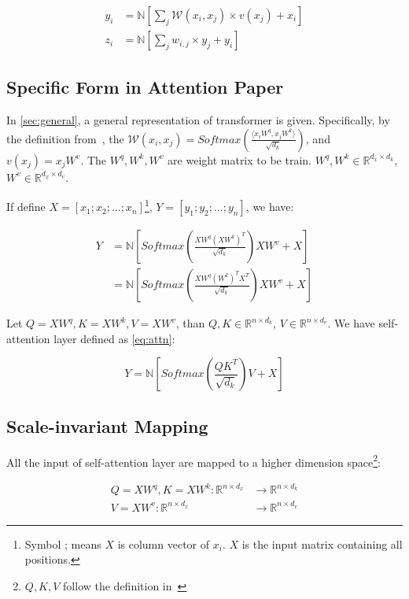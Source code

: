 \documentclass[final]{cvpr}
\begin{document}
\begin{align}
    {y_i}&=\mathbb{N}\left[\sum_{j}\mathcal{W}(x_i,x_j)\times{v}({x_j})+x_i\right]\label{eq:all-sa}\\
    {z_i}&=\mathbb{N}\left[\sum_jw_{i,j}\times{y_j}+y_i\right]\label{eq:all-ff}
\end{align}

\subsection{Specific Form in Attention Paper}
In \autoref{sec:general}, a general representation of transformer is given. Specifically, by the definition from~\cite{vaswani2017attention}, the $\mathcal{W}(x_i,x_j)=Softmax(\frac{\langle x_iW^q,x_jW^k\rangle}{\sqrt{d_k}})$, and $v(x_j)=x_jW^v$. The $W^q, W^k, W^v$ are weight matrix to be train. $W^q,W^k\in\mathbb{R}^{{d_x}\times{d_k}}$, $W^v\in\mathbb{R}^{d_x\times{d_v}}$.

If define $X=[x_1;x_2;...;x_n]$\footnote{Symbol ; means $X$ is column vector of $x_i$. $X$ is the input matrix containing all positions.}, $Y=[y_1;y_2;...;y_n]$, we have:

\begin{align}
    Y&=\mathbb{N}\left[Softmax\left(\frac{XW^q(XW^k)^T}{\sqrt{d_k}}\right)XW^v+X\right]\\
     &=\mathbb{N}\left[Softmax\left(\frac{XW^q(W^k)^TX^T}{\sqrt{d_k}}\right)XW^v+X\right]
\end{align}

Let $Q=XW^q, K=XW^k, V=XW^v$, than $Q,K\in\mathbb{R}^{n\times{d_k}}$, $V\in\mathbb{R}^{n\times{d_v}}$. We have self-attention layer defined as \autoref{eq:attn}:

\begin{equation}
    Y=\mathbb{N}\left[Softmax\left(\frac{QK^T}{\sqrt{d_k}}\right)V+X\right]\label{eq:attn}
\end{equation}
    

\subsection{Scale-invariant Mapping}
\label{sec:simap}

All the input of self-attention layer are mapped to a higher dimension space\footnote{$Q,K,V$ follow the definition in~\cite{vaswani2017attention}}:

\begin{align}
    Q=XW^q,K=XW^k: \mathbb{R}^{n\times{d_x}}&\to\mathbb{R}^{n\times{d_k}}\\
    V=XW^v: \mathbb{R}^{n\times{d_x}}&\to\mathbb{R}^{n\times{d_v}}
\end{align}
\end{document}
